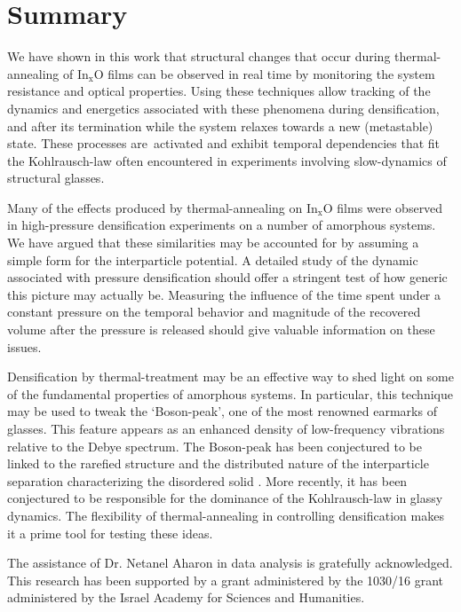 \documentclass
[preprint,showpacs,byrevtex,10pt,twocolumn,tightenlines,prl,letterpaper]{revtex4}%
\begin{document}
\section{Summary}

We have shown in this work that structural changes that occur during
thermal-annealing of In$_{\text{x}}$O films can be observed in real time by
monitoring the system resistance and optical properties. Using these
techniques allow tracking of the dynamics and energetics associated with these
phenomena during densification, and after its termination while the system
relaxes towards a new (metastable) state. These processes are\ activated and
exhibit temporal dependencies that fit the Kohlrausch-law often encountered in
experiments involving slow-dynamics of structural glasses.

Many of the effects produced by thermal-annealing on In$_{\text{x}}$O films
were observed in high-pressure densification experiments on a number of
amorphous systems. We have argued that these similarities may be accounted for
by assuming a simple form for the interparticle potential. A detailed study of
the dynamic associated with pressure densification should offer a stringent
test of how generic this picture may actually be. Measuring the influence of
the time spent under a constant pressure on the temporal behavior and
magnitude of the recovered volume after the pressure is released should give
valuable information on these issues.

Densification by thermal-treatment may be an effective way to shed light on
some of the fundamental properties of amorphous systems. In particular, this
technique may be used to tweak the `Boson-peak', one of the most renowned
earmarks of glasses. This feature appears as an enhanced density of
low-frequency vibrations relative to the Debye spectrum. The Boson-peak has
been conjectured to be linked to the rarefied structure \cite{36} and the
distributed nature of the interparticle separation characterizing the
disordered solid \cite{37}. More recently, it has been conjectured to be
responsible for the dominance of the Kohlrausch-law \cite{18} in glassy
dynamics. The flexibility of thermal-annealing in controlling densification
makes it a prime tool for testing these ideas.

\begin{acknowledgments}
The assistance of Dr. Netanel Aharon in data analysis is gratefully
acknowledged. This research has been supported by a grant administered by the
1030/16 grant administered by the Israel Academy for Sciences and Humanities.
\end{acknowledgments}
\end{document}
